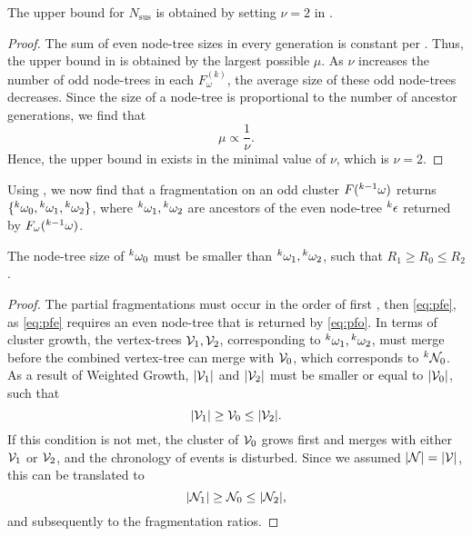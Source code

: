 \begin{theorem}\label{the:fragnumber}
  The upper bound for $N_{\text{sus}}$ is obtained by setting $\nu=2$ in . 
\end{theorem}
\begin{proof}
  The sum of even node-tree sizes in every generation is constant per . Thus, the upper bound in  is obtained by the largest possible $\mu$. As $\nu$ increases the number of odd node-trees in each $F^{(k)}_\omega$, the average size of these odd node-trees decreases. Since the size of a node-tree is proportional to the number of ancestor generations, we find that 
  \begin{equation*}
    \mu \propto \frac{1}{\nu}. 
  \end{equation*}
  Hence, the upper bound in  exists in the minimal value of $\nu$, which is $\nu = 2$.
\end{proof}

Using , we now find that a fragmentation on an odd cluster $F({}^{k-1}\omega)$ returns $\{{}^{k}\omega_0, {}^{k}\omega_1, {}^{k}\omega_2\}$, where ${}^{k}\omega_1, {}^{k}\omega_2$ are ancestors of the even node-tree ${}^{k}\epsilon$ returned by $F_\omega({}^{k-1}\omega)$. 

\begin{lemma}\label{lem:chrono}
  The node-tree size of ${}^{k}\omega_0$ must be smaller than ${}^{k}\omega_1, {}^{k}\omega_2$, such that $R_1 \geq R_0 \leq R_2$. 
\end{lemma}
\begin{proof}
  The partial fragmentations must occur in the order of first , then \eqref{eq:pfe}, as \eqref{eq:pfe} requires an even node-tree that is returned by \eqref{eq:pfo}. In terms of cluster growth, the vertex-trees $\mathcal{V}_1, \mathcal{V}_2$, corresponding to ${}^{k}\omega_1, {}^{k}\omega_2$, must merge before the combined vertex-tree can merge with $\mathcal{V}_0$, which corresponds to ${}^{k}\mathcal{N}_0$. As a result of Weighted Growth, $\lvert\mathcal{V}_1\rvert$ and $\lvert\mathcal{V}_2\rvert$ must be smaller or equal to $\lvert\mathcal{V}_0\rvert$, such that 
  \begin{equation*}
    \lvert\mathcal{V}_1\rvert\geq \mathcal{V}_0 \leq\lvert\mathcal{V}_2\rvert.
  \end{equation*}
  If this condition is not met, the cluster of $\mathcal{V}_0$ grows first and merges with either $\mathcal{V}_1$ or $\mathcal{V}_2$, and the chronology of events is disturbed. Since we assumed $\lvert\mathcal{N}\rvert=\lvert\mathcal{V}\rvert$, this can be translated to 
  \begin{equation*}
    \lvert\mathcal{N}_1\rvert\geq \mathcal{N}_0 \leq\lvert\mathcal{N}_2\rvert,
  \end{equation*}
  and subsequently to the fragmentation ratios.
\end{proof}


